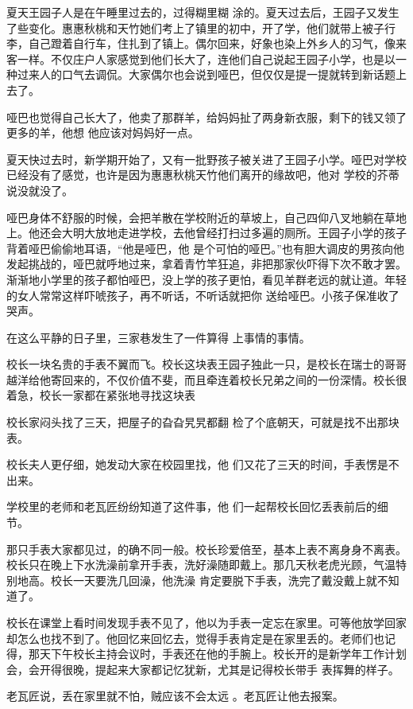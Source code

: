 \documentclass{article}
\begin{document}
夏天王园子人是在午睡里过去的，过得糊里糊
\newpage
涂的。夏天过去后，王园子又发生了些变化。惠惠秋桃和天竹她们考上了镇里的初中，开了学，他们就带上被子行李，自己蹬着自行车，住扎到了镇上。偶尔回来，好象也染上外乡人的习气，像来客一样。不仅庄户人家感觉到他们长大了，连他们自己说起王园子小学，也是以一种过来人的口气去调侃。大家偶尔也会说到哑巴，但仅仅是提一提就转到新话题上去了。

哑巴也觉得自己长大了，他卖了那群羊，给妈妈扯了两身新衣服，剩下的钱又领了更多的羊，他想
他应该对妈妈好一点。 

夏天快过去时，新学期开始了，又有一批野孩子被关进了王园子小学。哑巴对学校已经没有了感觉，也许是因为惠惠秋桃天竹他们离开的缘故吧，他对
学校的芥蒂说没就没了。 

哑巴身体不舒服的时候，会把羊散在学校附近的草坡上，自己四仰八叉地躺在草地上。他还会大明大放地走进学校，去他曾经打扫过多遍的厕所。王园子小学的孩子背着哑巴偷偷地耳语，“他是哑巴，他
\newpage
是个可怕的哑巴。”也有胆大调皮的男孩向他发起挑战的，哑巴就呼地过来，拿着青竹竿狂追，非把那家伙吓得下次不敢才罢。渐渐地小学里的孩子都怕哑巴，没上学的孩子更怕，看见羊群老远的就让道。年轻的女人常常这样吓唬孩子，再不听话，不听话就把你
送给哑巴。小孩子保准收了哭声。 

在这么平静的日子里，三家巷发生了一件算得
上事情的事情。 

校长一块名贵的手表不翼而飞。校长这块表王园子独此一只，是校长在瑞士的哥哥越洋给他寄回来的，不仅价值不斐，而且牵连着校长兄弟之间的一份深情。校长很着急，校长一家都在紧张地寻找这块表

校长家闷头找了三天，把屋子的旮旮旯旯都翻
检了个底朝天，可就是找不出那块表。 

校长夫人更仔细，她发动大家在校园里找，他
们又花了三天的时间，手表愣是不出来。 

\newpage

学校里的老师和老瓦匠纷纷知道了这件事，他
们一起帮校长回忆丢表前后的细节。 

那只手表大家都见过，的确不同一般。校长珍爱倍至，基本上表不离身身不离表。校长只在晚上下水洗澡前拿开手表，洗好澡随即戴上。那几天秋老虎光顾，气温特别地高。校长一天要洗几回澡，他洗澡
肯定要脱下手表，洗完了戴没戴上就不知道了。 

校长在课堂上看时间发现手表不见了，他以为手表一定忘在家里。可等他放学回家却怎么也找不到了。他回忆来回忆去，觉得手表肯定是在家里丢的。老师们也记得，那天下午校长主持会议时，手表还在他的手腕上。校长开的是新学年工作计划会，会开得很晚，提起来大家都记忆犹新，尤其是记得校长带手
表挥舞的样子。 

老瓦匠说，丢在家里就不怕，贼应该不会太远
。老瓦匠让他去报案。 
\end{document}
